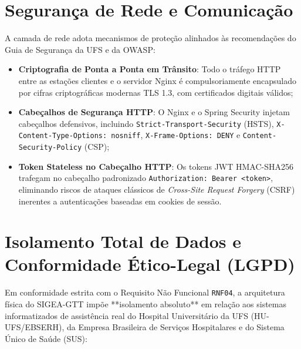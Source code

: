 \section{Segurança de Rede e Comunicação}
\label{sec_seguranca_rede}

A camada de rede adota mecanismos de proteção alinhados às recomendações do Guia de Segurança da UFS e da OWASP:
\begin{itemize}
    \item \textbf{Criptografia de Ponta a Ponta em Trânsito}: Todo o tráfego HTTP entre as estações clientes e o servidor Nginx é compulsoriamente encapsulado por cifras criptográficas modernas TLS 1.3, com certificados digitais válidos;
    \item \textbf{Cabeçalhos de Segurança HTTP}: O Nginx e o Spring Security injetam cabeçalhos defensivos, incluindo \texttt{Strict-Transport-Security} (HSTS), \texttt{X-Content-Type-Options: nosniff}, \texttt{X-Frame-Options: DENY} e \texttt{Content-Security-Policy} (CSP);
    \item \textbf{Token Stateless no Cabeçalho HTTP}: Os tokens JWT HMAC-SHA256 trafegam no cabeçalho padronizado \texttt{Authorization: Bearer <token>}, eliminando riscos de ataques clássicos de \textit{Cross-Site Request Forgery} (CSRF) inerentes a autenticações baseadas em cookies de sessão.
\end{itemize}

\section{Isolamento Total de Dados e Conformidade Ético-Legal (LGPD)}
\label{sec_isolamento_lgpd}

Em conformidade estrita com o Requisito Não Funcional \texttt{RNF04}, a arquitetura física do SIGEA-GTT impõe **isolamento absoluto** em relação aos sistemas informatizados de assistência real do Hospital Universitário da UFS (HU-UFS/EBSERH), da Empresa Brasileira de Serviços Hospitalares e do Sistema Único de Saúde (SUS):

